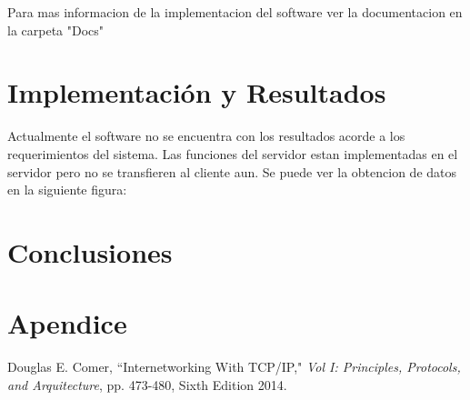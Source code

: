 \documentclass[10pt, a4paper,notitlepage]{article}
\begin{document}
Para mas informacion de la implementacion del software ver la documentacion en la carpeta "Docs"




\section{Implementación y Resultados}

Actualmente el software no se encuentra con los resultados acorde a los requerimientos del sistema. Las funciones del servidor estan implementadas en el servidor pero no se transfieren al cliente aun. Se puede ver la obtencion de datos en la siguiente figura:



\section{Conclusiones}

\section{Apendice}

\begin{thebibliography}{100} %
 Douglas E. Comer, ``Internetworking With TCP/IP," \emph{Vol I: Principles, Protocols, and Arquitecture}, pp. 473-480, Sixth Edition 2014.
\end{thebibliography}
\end{document}
